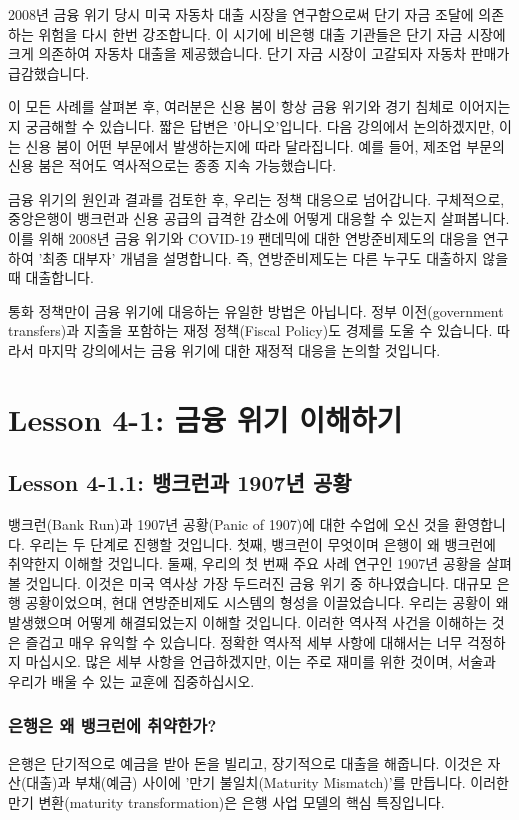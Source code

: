 \documentclass[11pt,a4paper]{article}
\begin{document}
2008년 금융 위기 당시 미국 자동차 대출 시장을 연구함으로써 단기 자금 조달에 의존하는 위험을 다시 한번 강조합니다. 이 시기에 비은행 대출 기관들은 단기 자금 시장에 크게 의존하여 자동차 대출을 제공했습니다. 단기 자금 시장이 고갈되자 자동차 판매가 급감했습니다.

이 모든 사례를 살펴본 후, 여러분은 신용 붐이 항상 금융 위기와 경기 침체로 이어지는지 궁금해할 수 있습니다. 짧은 답변은 '아니오'입니다. 다음 강의에서 논의하겠지만, 이는 신용 붐이 어떤 부문에서 발생하는지에 따라 달라집니다. 예를 들어, 제조업 부문의 신용 붐은 적어도 역사적으로는 종종 지속 가능했습니다.

금융 위기의 원인과 결과를 검토한 후, 우리는 정책 대응으로 넘어갑니다. 구체적으로, 중앙은행이 뱅크런과 신용 공급의 급격한 감소에 어떻게 대응할 수 있는지 살펴봅니다. 이를 위해 2008년 금융 위기와 COVID-19 팬데믹에 대한 연방준비제도의 대응을 연구하여 '최종 대부자' 개념을 설명합니다. 즉, 연방준비제도는 다른 누구도 대출하지 않을 때 대출합니다.

통화 정책만이 금융 위기에 대응하는 유일한 방법은 아닙니다. 정부 이전(government transfers)과 지출을 포함하는 재정 정책(Fiscal Policy)도 경제를 도울 수 있습니다. 따라서 마지막 강의에서는 금융 위기에 대한 재정적 대응을 논의할 것입니다.

\newpage

\section{Lesson 4-1: 금융 위기 이해하기}

\subsection{Lesson 4-1.1: 뱅크런과 1907년 공황}
뱅크런(Bank Run)과 1907년 공황(Panic of 1907)에 대한 수업에 오신 것을 환영합니다. 우리는 두 단계로 진행할 것입니다. 첫째, 뱅크런이 무엇이며 은행이 왜 뱅크런에 취약한지 이해할 것입니다. 둘째, 우리의 첫 번째 주요 사례 연구인 1907년 공황을 살펴볼 것입니다. 이것은 미국 역사상 가장 두드러진 금융 위기 중 하나였습니다. 대규모 은행 공황이었으며, 현대 연방준비제도 시스템의 형성을 이끌었습니다. 우리는 공황이 왜 발생했으며 어떻게 해결되었는지 이해할 것입니다. 이러한 역사적 사건을 이해하는 것은 즐겁고 매우 유익할 수 있습니다. 정확한 역사적 세부 사항에 대해서는 너무 걱정하지 마십시오. 많은 세부 사항을 언급하겠지만, 이는 주로 재미를 위한 것이며, 서술과 우리가 배울 수 있는 교훈에 집중하십시오.

\subsubsection*{은행은 왜 뱅크런에 취약한가?}
은행은 단기적으로 예금을 받아 돈을 빌리고, 장기적으로 대출을 해줍니다. 이것은 자산(대출)과 부채(예금) 사이에 '만기 불일치(Maturity Mismatch)'를 만듭니다. 이러한 만기 변환(maturity transformation)은 은행 사업 모델의 핵심 특징입니다.
\end{document}
